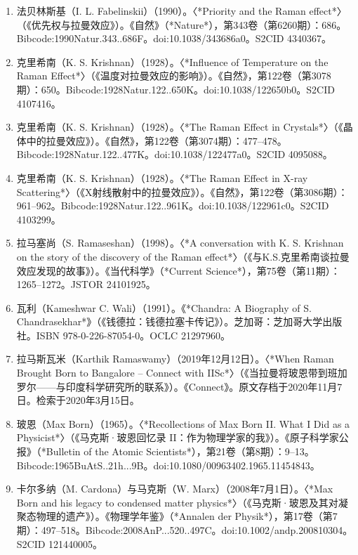 \begin{enumerate}
\item 法贝林斯基（I. L. Fabelinskii）（1990）。〈*Priority and the Raman effect*〉（《优先权与拉曼效应》）。《自然》（*Nature*），第343卷（第6260期）：686。Bibcode:1990Natur.343..686F。doi:10.1038/343686a0。S2CID 4340367。

\item 克里希南（K. S. Krishnan）（1928）。〈*Influence of Temperature on the Raman Effect*〉（《温度对拉曼效应的影响》）。《自然》，第122卷（第3078期）：650。Bibcode:1928Natur.122..650K。doi:10.1038/122650b0。S2CID 4107416。

\item 克里希南（K. S. Krishnan）（1928）。〈*The Raman Effect in Crystals*〉（《晶体中的拉曼效应》）。《自然》，第122卷（第3074期）：477–478。Bibcode:1928Natur.122..477K。doi:10.1038/122477a0。S2CID 4095088。

\item 克里希南（K. S. Krishnan）（1928）。〈*The Raman Effect in X-ray Scattering*〉（《X射线散射中的拉曼效应》）。《自然》，第122卷（第3086期）：961–962。Bibcode:1928Natur.122..961K。doi:10.1038/122961c0。S2CID 4103299。

\item 拉马塞尚（S. Ramaseshan）（1998）。〈*A conversation with K. S. Krishnan on the story of the discovery of the Raman effect*〉（《与K.S.克里希南谈拉曼效应发现的故事》）。《当代科学》（*Current Science*），第75卷（第11期）：1265–1272。JSTOR 24101925。

\item 瓦利（Kameshwar C. Wali）（1991）。《*Chandra: A Biography of S. Chandrasekhar*》（《钱德拉：钱德拉塞卡传记》）。芝加哥：芝加哥大学出版社。ISBN 978-0-226-87054-0。OCLC 21297960。

\item 拉马斯瓦米（Karthik Ramaswamy）（2019年12月12日）。〈*When Raman Brought Born to Bangalore – Connect with IISc*〉（《当拉曼将玻恩带到班加罗尔——与印度科学研究所的联系》）。《Connect》。原文存档于2020年11月7日。检索于2020年3月15日。

\item 玻恩（Max Born）（1965）。〈*Recollections of Max Born II. What I Did as a Physicist*〉（《马克斯·玻恩回忆录 II：作为物理学家的我》）。《原子科学家公报》（*Bulletin of the Atomic Scientists*），第21卷（第8期）：9–13。Bibcode:1965BuAtS..21h...9B。doi:10.1080/00963402.1965.11454843。

\item 卡尔多纳（M. Cardona）与马克斯（W. Marx）（2008年7月1日）。〈*Max Born and his legacy to condensed matter physics*〉（《马克斯·玻恩及其对凝聚态物理的遗产》）。《物理学年鉴》（*Annalen der Physik*），第17卷（第7期）：497–518。Bibcode:2008AnP...520..497C。doi:10.1002/andp.200810304。S2CID 121440005。


\end{enumerate}
